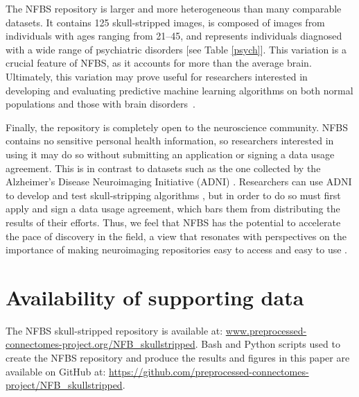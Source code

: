The NFBS repository is larger and more heterogeneous than many comparable datasets. It contains 125 skull-stripped images, is composed of images from individuals with ages ranging from 21--45, and represents individuals diagnosed with a wide range of psychiatric disorders [see Table \ref{psych}]. This variation is a crucial feature of NFBS, as it accounts for more than the average brain. Ultimately, this variation may prove useful for researchers interested in developing and evaluating predictive machine learning algorithms on both normal populations and those with brain disorders~\cite{gabrieli2015prediction}.

Finally, the repository is completely open to the neuroscience community. NFBS contains no sensitive personal health information, so researchers interested in using it may do so without submitting an application or signing a data usage agreement. This is in contrast to datasets such as the one collected by the Alzheimer's Disease Neuroimaging Initiative (ADNI) \cite{pmid17476317}. Researchers can use ADNI to develop and test skull-stripping algorithms \cite{pmid21195780}, but in order to do so must first apply and sign a data usage agreement, which bars them from distributing the results of their efforts. Thus, we feel that NFBS has the potential to accelerate the pace of discovery in the field, a view that resonates with perspectives on the importance of making neuroimaging repositories easy to access and easy to use \cite{Nichols054262}.

\section*{Availability of supporting data}
The NFBS skull-stripped repository is available at: \url{www.preprocessed-connectomes-project.org/NFB\_skullstripped}. Bash and Python scripts used to create the NFBS repository and produce the results and figures in this paper are available on GitHub at: \url{https://github.com/preprocessed-connectomes-project/NFB\_skullstripped}.
